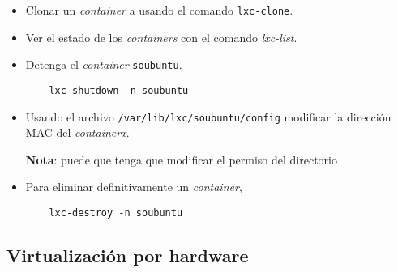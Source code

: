 \begin{questions}
\begin{itemize}
\item Clonar un \textit{container} a usando el comando \texttt{lxc-clone}.
\item Ver el estado de los \textit{containers} con el comando
  \textit{lxc-list}.
\item Detenga el \textit{container} \texttt{soubuntu}.
\begin{verbatim}
  	lxc-shutdown -n soubuntu
\end{verbatim}
\item Usando el archivo \texttt{/var/lib/lxc/soubuntu/config} modificar la
  dirección MAC del \textit{containerx}.

  \textbf{Nota}: puede que tenga que modificar el permiso del directorio
  
\item Para eliminar definitivamente un \textit{container},
\begin{verbatim}
   	lxc-destroy -n soubuntu
\end{verbatim}
  
\end{itemize}

\subsection{Virtualización por hardware}

\end{questions}